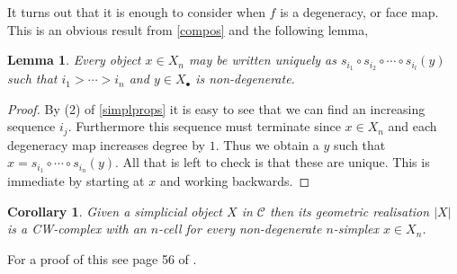 \documentclass{amsart}
\newtheorem{lemma}[theorem]{Lemma}
\newtheorem{corollary}[theorem]{Corollary}
\theoremstyle{definition}
\begin{document}
It turns out that it is enough to consider when $f$ is a degeneracy, or face map.
This is an obvious result from \ref{compos} and the following lemma,

\begin{lemma}
  Every object $x\in X_n$ may be written uniquely as
  $s_{i_1}\circ s_{i_2} \circ \cdots \circ s_{i_l} (y)$ such that
  $i_1>\cdots > i_n$ and $y\in X_\bullet$ is non-degenerate.
\end{lemma}
\begin{proof}
  By (2) of \ref{simplprops} it is easy to see that we can find an
  increasing sequence $i_j$. Furthermore this sequence must terminate since
  $x\in X_n$ and each degeneracy map increases degree by $1$. Thus we obtain
  a $y$ such that $x=s_{i_1}\circ \cdots \circ s_{i_n} (y)$. All that is
  left to check is that these are unique. This is immediate by starting
  at $x$ and working backwards. 
\end{proof}

\begin{corollary}
  Given a simplicial object $X$ in $\mathcal{C}$ then its geometric
  realisation $|X|$ is a CW-complex with an $n$-cell for every non-degenerate
  $n$-simplex $x\in X_n$.
\end{corollary}
For a proof of this see page 56 of \cite{May}.
\end{document}
